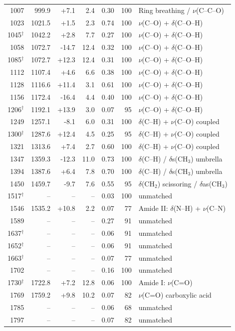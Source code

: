 \documentclass[preprint,12pt]{elsarticle}
\begin{document}
\begin{table}[htbp]
\begin{tabular}{rrrrrrp{4.4cm}}
1007 & 999.9 & +7.1 & 2.4 & 0.30 & 100 & Ring breathing / $\nu$(C--C--O) \\
1023 & 1021.5 & +1.5 & 2.3 & 0.74 & 100 & $\nu$(C--O) + $\delta$(C--O--H) \\
1045$^{\dagger}$ & 1042.2 & +2.8 & 7.7 & 0.27 & 100 & $\nu$(C--O) + $\delta$(C--O--H) \\
1058 & 1072.7 & -14.7 & 12.4 & 0.32 & 100 & $\nu$(C--O) + $\delta$(C--O--H) \\
1085$^{\dagger}$ & 1072.7 & +12.3 & 12.4 & 0.31 & 100 & $\nu$(C--O) + $\delta$(C--O--H) \\
1112 & 1107.4 & +4.6 & 6.6 & 0.38 & 100 & $\nu$(C--O) + $\delta$(C--O--H) \\
1128 & 1116.6 & +11.4 & 3.1 & 0.61 & 100 & $\nu$(C--O) + $\delta$(C--O--H) \\
1156 & 1172.4 & -16.4 & 4.4 & 0.40 & 100 & $\nu$(C--O) + $\delta$(C--O--H) \\
1206$^{\dagger}$ & 1192.1 & +13.9 & 3.0 & 0.07 & 95 & $\nu$(C--O) + $\delta$(C--O--H) \\
1249 & 1257.1 & -8.1 & 6.0 & 0.31 & 100 & $\delta$(C--H) + $\nu$(C--O) coupled \\
1300$^{\dagger}$ & 1287.6 & +12.4 & 4.5 & 0.25 & 95 & $\delta$(C--H) + $\nu$(C--O) coupled \\
1321 & 1313.6 & +7.4 & 2.7 & 0.60 & 100 & $\delta$(C--H) + $\nu$(C--O) coupled \\
1347 & 1359.3 & -12.3 & 11.0 & 0.73 & 100 & $\delta$(C--H) / $\delta$s(CH$_3$) umbrella \\
1394 & 1387.6 & +6.4 & 7.8 & 0.70 & 100 & $\delta$(C--H) / $\delta$s(CH$_3$) umbrella \\
1450 & 1459.7 & -9.7 & 7.6 & 0.55 & 95 & $\delta$(CH$_2$) scissoring / $\delta$as(CH$_3$) \\
1517$^{\dagger}$ & -- & -- & -- & 0.03 & 100 & unmatched \\
1546 & 1535.2 & +10.8 & 2.2 & 0.07 & 77 & Amide II: $\delta$(N--H) + $\nu$(C--N) \\
1589 & -- & -- & -- & 0.27 & 91 & unmatched \\
1637$^{\dagger}$ & -- & -- & -- & 0.06 & 91 & unmatched \\
1652$^{\dagger}$ & -- & -- & -- & 0.06 & 91 & unmatched \\
1663$^{\dagger}$ & -- & -- & -- & 0.07 & 77 & unmatched \\
1702 & -- & -- & -- & 0.16 & 100 & unmatched \\
1730$^{\dagger}$ & 1722.8 & +7.2 & 12.8 & 0.06 & 100 & Amide I: $\nu$(C=O) \\
1769 & 1759.2 & +9.8 & 10.2 & 0.07 & 82 & $\nu$(C=O) carboxylic acid \\
1785 & -- & -- & -- & 0.06 & 68 & unmatched \\
1797 & -- & -- & -- & 0.07 & 82 & unmatched \\
\bottomrule
\end{tabular}
\end{table}
\end{document}
